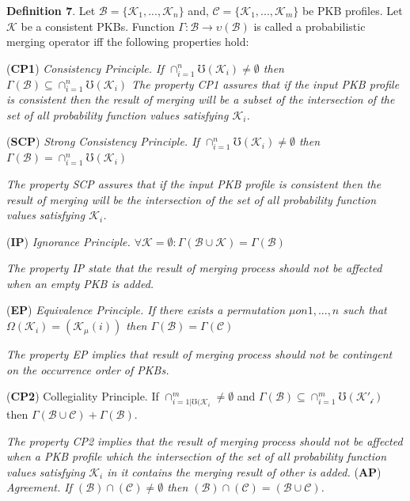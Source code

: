 \documentclass[]{iosart2c}
\begin{document}
  \textbf{Definition 7}. Let $\mathcal{B} = \{\mathcal{K}_1 , ... ,\mathcal{K}_n\}$ and, $\mathcal{C} = \{\mathcal{K}_1, ... ,\mathcal{K}_m\}$ be PKB profiles. Let $\mathcal{K}$ be a consistent PKBs. Function $\Gamma: \mathcal{B} \to \upsilon(\mathcal{B})$ is called a probabilistic merging operator iff the following properties hold:

  (\textbf{CP1}) \textit{Consistency Principle. If $\cap^n_{i=1}\mho(\mathcal{K}_i) \neq \emptyset$ then $\Gamma(\mathcal{B}) \subseteq \cap^n_{i=1}\mho(\mathcal{K}_i)$
    The property CP1 assures that if the input PKB profile is consistent then the result of merging will be a subset of the intersection of the set of all probability function values satisfying $\mathcal{K}_i$.}

  (\textbf{SCP}) \textit{Strong Consistency Principle. If $\cap^n_{i=1}\mho(\mathcal{K}_i) \neq \emptyset$ then $\Gamma(\mathcal{B}) = \cap^n_{i=1}\mho(\mathcal{K}_i)$}

  \textit{The property SCP assures that if the input PKB profile is consistent then the result of merging will be the intersection of the set of all probability function
  values satisfying $\mathcal{K}_i$.}

  (\textbf{IP}) \textit{Ignorance Principle. $\forall \mathcal{K} = \emptyset : \Gamma(\mathcal{B} \cup \mathcal{K}) = \Gamma(\mathcal{B})$}

  \textit{The property IP state that the result of merging process should not be affected when an empty PKB is added.}

  (\textbf{EP}) \textit{Equivalence Principle. If there exists a permutation $\mu on {1, ... , n}$ such that $\Omega(\mathcal{K}_i) = (\mathcal{K}_\mu(i))$ then $\Gamma(\mathcal{B}) =  \Gamma(\mathcal{C})$}

  \textit{The property EP implies that result of merging process should not be contingent on the occurrence order of PKBs.}

  (\textbf{CP2}) Collegiality Principle. If $\cap^m_{i=1|\mho(\mathcal{K}_i} \neq \emptyset$ and $\Gamma(\mathcal{B}) \subseteq \cap^m_{i=1}\mho(\mathcal{K'_i})$ then $\Gamma(\mathcal{B} \cup \mathcal{C}) + \Gamma(\mathcal{B})$.

  \textit{The property CP2 implies that the result of merging process should not be affected when a PKB profile which the intersection of the set of all probability function values satisfying $\mathcal{K}_i$ in it contains the merging result of other is added.
  }
  (\textbf{AP}) \textit{Agreement. If $(\mathcal{B}) \cap (\mathcal{C}) \neq \emptyset$ then $(\mathcal{B}) \cap (\mathcal{C}) = (\mathcal{B} \cup \mathcal{C})$.}
\end{document}

